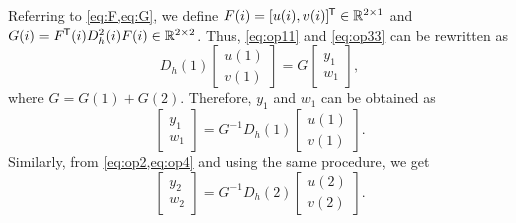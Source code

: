 \documentclass{article}
\newcommand*{\tran}{^{\mkern-1.5mu\mathsf{T}}}
\begin{document}
Referring to \cref{eq:F,eq:G}, we define $F(i) = [u(i), v(i)]\tran \in \mathbb{R}^{2\times1}$ and $G(i) = F\tran(i) D_h^2(i) F(i) \in \mathbb{R}^{2\times2}$. Thus, \cref{eq:op11} and \cref{eq:op33} can be rewritten as 
\begin{equation}
    D_h(1) \begin{bmatrix} u(1) \\ v(1) \end{bmatrix} = G \begin{bmatrix} y_1 \\ w_1 \end{bmatrix}, 
\end{equation}
where $G = G(1) + G(2)$. Therefore, $y_1$ and $w_1$ can be obtained as
\begin{equation}
    \begin{bmatrix} y_1 \\ w_1 \end{bmatrix} = G^{-1} D_h(1) \begin{bmatrix} u(1) \\ v(1) \end{bmatrix}. \label{eq:y1w1}
\end{equation}
Similarly, from \cref{eq:op2,eq:op4} and using the same procedure, we get 
\begin{equation}
    \begin{bmatrix} y_2 \\ w_2 \end{bmatrix} = G^{-1} D_h(2) \begin{bmatrix} u(2) \\ v(2) \end{bmatrix}. \label{eq:y2w2}
\end{equation}


\end{document}
